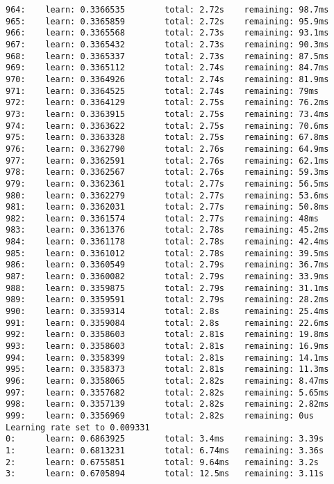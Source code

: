 \documentclass[11pt]{article}
\begin{document}
\begin{Verbatim}[commandchars=\\\{\}]
964:    learn: 0.3366535        total: 2.72s    remaining: 98.7ms
965:    learn: 0.3365859        total: 2.72s    remaining: 95.9ms
966:    learn: 0.3365568        total: 2.73s    remaining: 93.1ms
967:    learn: 0.3365432        total: 2.73s    remaining: 90.3ms
968:    learn: 0.3365337        total: 2.73s    remaining: 87.5ms
969:    learn: 0.3365112        total: 2.74s    remaining: 84.7ms
970:    learn: 0.3364926        total: 2.74s    remaining: 81.9ms
971:    learn: 0.3364525        total: 2.74s    remaining: 79ms
972:    learn: 0.3364129        total: 2.75s    remaining: 76.2ms
973:    learn: 0.3363915        total: 2.75s    remaining: 73.4ms
974:    learn: 0.3363622        total: 2.75s    remaining: 70.6ms
975:    learn: 0.3363328        total: 2.75s    remaining: 67.8ms
976:    learn: 0.3362790        total: 2.76s    remaining: 64.9ms
977:    learn: 0.3362591        total: 2.76s    remaining: 62.1ms
978:    learn: 0.3362567        total: 2.76s    remaining: 59.3ms
979:    learn: 0.3362361        total: 2.77s    remaining: 56.5ms
980:    learn: 0.3362279        total: 2.77s    remaining: 53.6ms
981:    learn: 0.3362031        total: 2.77s    remaining: 50.8ms
982:    learn: 0.3361574        total: 2.77s    remaining: 48ms
983:    learn: 0.3361376        total: 2.78s    remaining: 45.2ms
984:    learn: 0.3361178        total: 2.78s    remaining: 42.4ms
985:    learn: 0.3361012        total: 2.78s    remaining: 39.5ms
986:    learn: 0.3360549        total: 2.79s    remaining: 36.7ms
987:    learn: 0.3360082        total: 2.79s    remaining: 33.9ms
988:    learn: 0.3359875        total: 2.79s    remaining: 31.1ms
989:    learn: 0.3359591        total: 2.79s    remaining: 28.2ms
990:    learn: 0.3359314        total: 2.8s     remaining: 25.4ms
991:    learn: 0.3359084        total: 2.8s     remaining: 22.6ms
992:    learn: 0.3358603        total: 2.81s    remaining: 19.8ms
993:    learn: 0.3358603        total: 2.81s    remaining: 16.9ms
994:    learn: 0.3358399        total: 2.81s    remaining: 14.1ms
995:    learn: 0.3358373        total: 2.81s    remaining: 11.3ms
996:    learn: 0.3358065        total: 2.82s    remaining: 8.47ms
997:    learn: 0.3357682        total: 2.82s    remaining: 5.65ms
998:    learn: 0.3357139        total: 2.82s    remaining: 2.82ms
999:    learn: 0.3356969        total: 2.82s    remaining: 0us
Learning rate set to 0.009331
0:      learn: 0.6863925        total: 3.4ms    remaining: 3.39s
1:      learn: 0.6813231        total: 6.74ms   remaining: 3.36s
2:      learn: 0.6755851        total: 9.64ms   remaining: 3.2s
3:      learn: 0.6705894        total: 12.5ms   remaining: 3.11s

\end{Verbatim}
\end{document}
